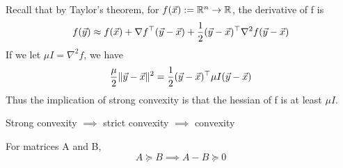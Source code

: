 \begin{remark}
	Recall that by Taylor's theorem, for $f(\vec{x}):=\mathbb{R}^n\rightarrow\mathbb{R}$, the derivative of f is
	\[
f(\vec{y}) \approx f(\vec{x})+\nabla f^\top(\vec{y}-\vec{x}) + \frac{1}{2}(\vec{y}-\vec{x})^\top\nabla^2f(\vec{y}-\vec{x})
	\]
	If we let $\mu I = \nabla^2f$, we have
	\[
\frac{\mu}{2}\|\vec{y}-\vec{x}\|^2 = \frac{1}{2}(\vec{y}-\vec{x})^\top\mu I(\vec{y}-\vec{x})
	\]
	Thus the implication of strong convexity is that the hessian of f is at least $\mu I$.
\end{remark}

\begin{remark}
	Strong convexity $\implies$ strict convexity $\implies$ convexity
\end{remark}

\begin{remark}
	For matrices A and B, 
	\[
	A \succeq B \implies A-B\succeq 0
	\]
\end{remark}


